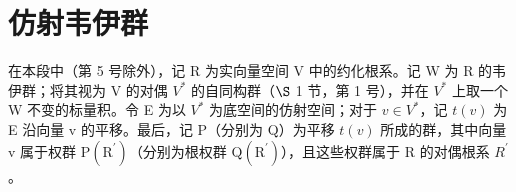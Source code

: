 \section{仿射韦伊群}

在本段中（第 5 号除外），记 R 为实向量空间 V 中的约化根系。记 W 为 R 的韦伊群；将其视为 V 的对偶 \(V^{*}\) 的自同构群（\(\S\) 1 节，第 1 号），并在 \(V^{*}\) 上取一个 W 不变的标量积。令 E 为以 \(V^{*}\) 为底空间的仿射空间；对于 \(v \in V^{*}\)，记 \(t(v)\) 为 E 沿向量 v 的平移。最后，记 P（分别为 Q）为平移 \(t(v)\) 所成的群，其中向量 v 属于权群 \(\mathrm{P}(\mathrm{R}^{\prime})\)（分别为根权群 \(\mathrm{Q}(\mathrm{R}^{\prime})\)），且这些权群属于 R 的对偶根系 \(R^{\prime}\)。

